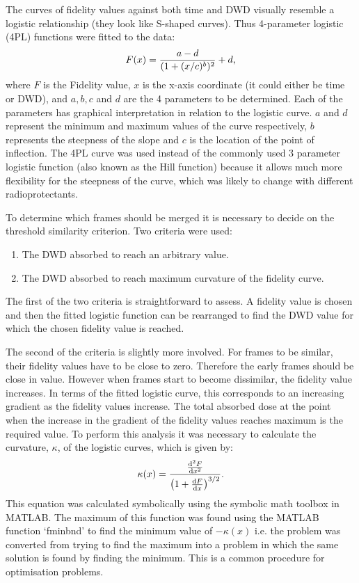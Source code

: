 The curves of fidelity values against both time and DWD visually resemble a logistic relationship (they look like S-shaped curves).
Thus 4-parameter logistic (4PL) functions were fitted to the data:
\begin{equation}
    F(x) = \frac{a - d}{(1 + (x/c)^b)^2} + d,
    \label{eq:4PL}
\end{equation}
where $F$ is the Fidelity value, $x$ is the x-axis coordinate (it could either be time or DWD), and $a, b, c$ and $d$ are the 4 parameters to be determined.
Each of the parameters has graphical interpretation in relation to the logistic curve.
$a$ and $d$ represent the minimum and maximum values of the curve respectively, $b$ represents the steepness of the slope and $c$ is the location of the point of inflection.
The 4PL curve was used instead of the commonly used 3 parameter logistic function (also known as the Hill function) because it allows much more flexibility for the steepness of the curve, which was likely to change with different radioprotectants.

To determine which frames should be merged it is necessary to decide on the threshold similarity criterion.
Two criteria were used:
\begin{enumerate}
    \item The DWD absorbed to reach an arbitrary value.
    \item The DWD absorbed to reach maximum curvature of the fidelity curve.
\end{enumerate}
The first of the two criteria is straightforward to assess.
A fidelity value is chosen and then the fitted logistic function can be rearranged to find the DWD value for which the chosen fidelity value is reached.

The second of the criteria is slightly more involved. For frames to be similar, their fidelity values have to be close to zero.
Therefore the early frames should be close in value.
However when frames start to become dissimilar, the fidelity value increases.
In terms of the fitted logistic curve, this corresponds to an increasing gradient as the fidelity values increase.
The total absorbed dose at the point when the increase in the gradient of the fidelity values reaches maximum is the required value.
To perform this analysis it was necessary to calculate the curvature, $\kappa$, of the logistic curves, which is  given by:
\begin{equation}
    \kappa(x) = \frac{\frac{\mathrm{d}^2F}{\mathrm{d}x^2}}{\left( 1 + \frac{\mathrm{d}F}{\mathrm{d}x}\right)^{3/2}}.
    \label{eq:Curvature}
\end{equation}
This equation was calculated symbolically using the symbolic math toolbox in MATLAB. The maximum of this function was found using the MATLAB function `fminbnd' to find the minimum value of $-\kappa(x)$ i.e. the problem was converted from trying to find the maximum into a problem in which the same solution is found by finding the minimum. This is a common procedure for optimisation problems.

